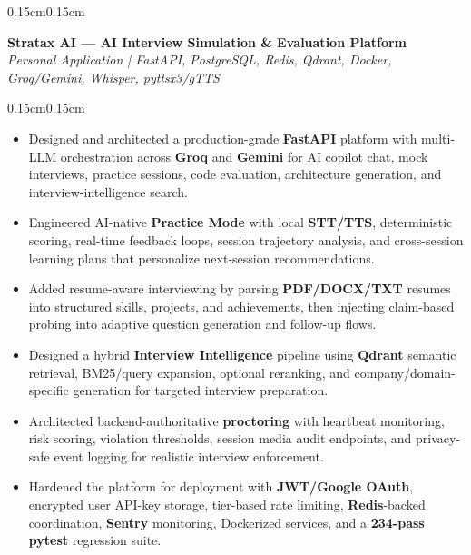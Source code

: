 \documentclass[10pt, letterpaper]{article}
\newenvironment{highlights}{
\begin{itemize}[leftmargin=0.35cm, itemsep=1pt, topsep=1pt, parsep=0pt]
}{
\end{itemize}
}
\newenvironment{onecolentry}{
\begin{adjustwidth}{0.15cm}{0.15cm}
}{
\end{adjustwidth}
}
\begin{document}
\begin{onecolentry}
    \textbf{Stratax AI --- AI Interview Simulation \& Evaluation Platform}\\
{\small\textit{Personal Application | FastAPI, PostgreSQL, Redis, Qdrant, Docker, Groq/Gemini, Whisper, pyttsx3/gTTS}}
\end{onecolentry}
\begin{onecolentry}
\begin{highlights}
\item Designed and architected a production-grade \textbf{FastAPI} platform with multi-LLM orchestration across \textbf{Groq} and \textbf{Gemini} for AI copilot chat, mock interviews, practice sessions, code evaluation, architecture generation, and interview-intelligence search.
\item Engineered AI-native \textbf{Practice Mode} with local \textbf{STT/TTS}, deterministic scoring, real-time feedback loops, session trajectory analysis, and cross-session learning plans that personalize next-session recommendations.
\item Added resume-aware interviewing by parsing \textbf{PDF/DOCX/TXT} resumes into structured skills, projects, and achievements, then injecting claim-based probing into adaptive question generation and follow-up flows.
\item Designed a hybrid \textbf{Interview Intelligence} pipeline using \textbf{Qdrant} semantic retrieval, BM25/query expansion, optional reranking, and company/domain-specific generation for targeted interview preparation.
\item Architected backend-authoritative \textbf{proctoring} with heartbeat monitoring, risk scoring, violation thresholds, session media audit endpoints, and privacy-safe event logging for realistic interview enforcement.
\item Hardened the platform for deployment with \textbf{JWT/Google OAuth}, encrypted user API-key storage, tier-based rate limiting, \textbf{Redis}-backed coordination, \textbf{Sentry} monitoring, Dockerized services, and a \textbf{234-pass pytest} regression suite.
\end{highlights}
\end{onecolentry}

\vspace{0.2 cm}
\end{document}
